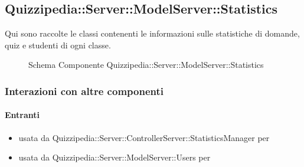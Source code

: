 \subsection{Quizzipedia::Server::ModelServer::Statistics}
Qui sono raccolte le classi contenenti le informazioni sulle statistiche di domande, quiz e studenti di ogni classe.
\begin{figure}[H]
\centering
\noindent{}
\caption[Schema Componente Quizzipedia::Server::ModelServer::Statistics]{Schema Componente Quizzipedia::Server::ModelServer::Statistics}
\end{figure}
\subsubsection{Interazioni con altre componenti}
\paragraph{Entranti}
\begin{itemize}
\item usata da Quizzipedia::Server::ControllerServer::StatisticsManager per 
\item usata da Quizzipedia::Server::ModelServer::Users per 
\end{itemize}
